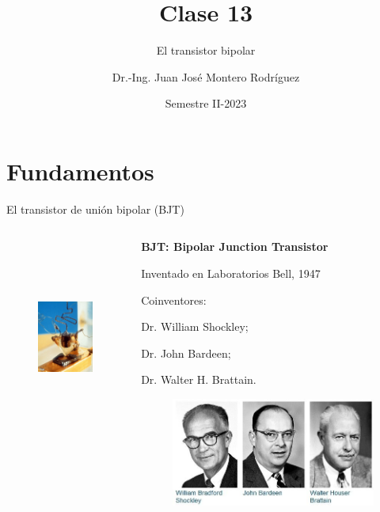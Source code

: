 \documentclass[t,aspectratio=169]{beamer}
\title{Clase 13}
\subtitle{El transistor bipolar}
\author{Dr.-Ing. Juan José Montero Rodríguez}
\institute{Escuela de Ingeniería Electrónica}
\date{Semestre II-2023}
\begin{document}
\begin{frame}{}
\maketitle
\end{frame}


\section{Fundamentos}
\begin{frame}{El transistor de unión bipolar (BJT)}

\begin{columns}
\begin{column}{0.5\textwidth}

\begin{figure}
    \centering
    \includegraphics[height=6.5cm]{figures/the_first_transistor.jpg}
\end{figure}

\end{column}
\begin{column}{0.5\textwidth}
    \textbf{BJT: Bipolar Junction Transistor}

    Inventado en Laboratorios Bell, 1947

    \vspace{5mm}
    Coinventores:
    
    Dr. William Shockley;
    
    Dr. John Bardeen;
    
    Dr. Walter H. Brattain.

    \begin{figure}
        \centering
        \includegraphics[width=\textwidth]{figures/the_first_transistor_2.jpg}
    \end{figure}


\end{column}
\end{columns}
\end{frame}
\end{document}
